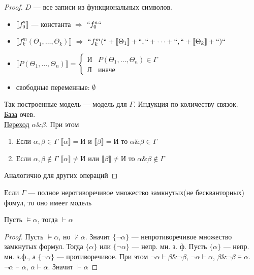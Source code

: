 \documentclass[english]{article}
\begin{document}
\begin{proof}
	\(D\) --- все записи из функциональных символов.
	\begin{itemize}
		\item \(\llbracket f_0^n \rrbracket\) --- константа \(\Rightarrow\) \(``f_0^n``\)
		\item \(\llbracket f_k^m (\Theta_1, \dots, \Theta_k) \rrbracket\) \(\Rightarrow\) \(``f_k^m(`` + \llbracket \Theta_1 \rrbracket + ``,`` + \dots + ``,`` + \llbracket \Theta_k \rrbracket + ``)``\)
		\item \(\llbracket P(\Theta_1, \dots, \Theta_n) \rrbracket = \begin{cases} \text{И} & P(\Theta_1, \dots, \Theta_n) \in \Gamma \\ \text{Л} & \text{иначе} \end{cases}\)
		\item свободные переменные: \(\emptyset\)
	\end{itemize}
	Так построенные модель --- модель для \(\Gamma\). Индукция по количеству связок. \\
	\uline{База} очев. \\
	\uline{Переход} \(\alpha \& \beta\). При этом
	\begin{enumerate}
		\item Если \(\alpha, \beta \in \Gamma\) \(\llbracket \alpha \rrbracket = \text{И}\) и \(\llbracket \beta \rrbracket = \text{И}\) то \(\alpha \& \beta \in \Gamma\)
		\item Если \(\alpha, \beta \not\in \Gamma\) \(\llbracket \alpha \rrbracket \neq \text{И}\) или \(\llbracket \beta \rrbracket \neq \text{И}\) то \(\alpha \& \beta \not\in \Gamma\)
	\end{enumerate}
	Аналогично для других операций
\end{proof}
\begin{theorem}
	Если \(\Gamma\) --- полное неротиворечивое множество замкнутых(не бескванторных) фомул, то оно имеет модель
	\label{orgb1dc6a8}
\end{theorem}
\begin{corollary}
	Пусть \(\vDash \alpha\), тогда \(\vdash \alpha\)
	\label{org15bad21}
\end{corollary}
\begin{proof}
	Пусть \(\vDash \alpha\), но \(\not\vdash \alpha\). Значит \(\{\neg \alpha\}\) --- непротиворечивое множество замкнутых формул. Тогда \(\{\alpha\}\) или \(\{\neg \alpha\}\) --- непр. мн. з. ф. Пусть \(\{\alpha\}\) --- непр. мн. з.ф., а \(\{\neg \alpha\}\) --- противоречивое. При этом \(\neg \alpha \vdash \beta \& \neg \beta\), \(\neg \alpha \vdash \alpha\), \(\beta \& \neg \beta \vDash \alpha\). \(\neg \alpha \vdash \alpha\), \(\alpha \vdash \alpha\). Значит \(\vdash \alpha\)
\end{proof}
\end{document}
